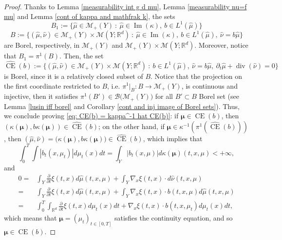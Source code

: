 \documentclass[10pt,leqno]{amsart}
\numberwithin{equation}{section}
\newcommand{\R}{\mathbb{R}}
\begin{document}
\begin{proof}
    Thanks to Lemma \ref{measurability int g d mu}, Lemma \ref{measurability nu=f mu} and Lemma \ref{cont of kappa and mathfrak k}, the sets 
    \[B_1:= \{\hat{\mu}\in \mathcal{M}_+(Y) \ : \ \hat{\mu}\in \operatorname{Im}(\kappa), \ b \in L^1(\hat{\mu})\}\]\[ B := \{(\hat{\mu},\hat{\nu})\in \mathcal{M}_+(Y)\times\mathcal{M}(Y;\R^d) \ : \ \hat{\mu}\in \operatorname{Im}(\kappa), \ b\in L^1(\hat{\mu}), \ \hat{\nu} = b\hat{\mu}\}\]
    are Borel, respectively, in $\mathcal{M}_+(Y)$ and $\mathcal{M}_+(Y)\times \mathcal{M}(Y;\R^d)$. Moreover, notice that $B_1 = \pi^1(B)$. Then, the set  
    \[\hat{\operatorname{CE}}(b):= \{(\hat{\mu},\hat{\nu})\in \mathcal{M}_+(Y)\times\mathcal{M}(Y;\R^d) \ : \ b\in L^1(\hat{\mu}), \ \hat{\nu} = b\hat{\mu},\ \partial_t\hat{\mu}+ \operatorname{div}(\hat{\nu})=0\}\]
    is Borel, since it is a relatively closed subset of $B$.
    Notice that the projection on the first coordinate restricted to $B$, i.e. $\pi^1|_{B} : B \to \mathcal{M}_+(Y)$, is continuous and injective, then it satisfies $\pi^1(B')\in \mathcal{B}\big(\mathcal{M}_+(Y)\big)$ for all $B'\subset B$ Borel set (see Lemma \ref{lusin iff borel} and Corollary \ref{cont and inj image of Borel sets}).
    Thus, we conclude proving \eqref{eq: CE(b) = kappa^-1 hat CE(b)}: if $\boldsymbol{\mu} \in \operatorname{CE}(b)$, then $(\kappa(\boldsymbol{\mu}), b \kappa(\boldsymbol{\mu})) \in \hat{\operatorname{CE}}(b)$; on the other hand, if $\boldsymbol{\mu}\in \kappa^{-1}(\pi^1(\hat{\operatorname{CE}}(b)))$, then $(\hat{\mu},\hat{\nu}) = \big(\kappa(\boldsymbol{\mu}),b \kappa(\boldsymbol{\mu})\big)\in \hat{\operatorname{CE}}(b)$, which implies that 
    \[\int_0^T \int |b_t(x,\mu_t)|d\mu_t(x) dt = \int_Y |b_t(x,\mu)|d\kappa(\boldsymbol{\mu})(t,x,\mu) <+\infty,\]
    and
    \begin{align*}
        0 = & \int_Y \frac{\partial}{\partial t}\xi(t,x) d\hat{\mu}(t,x,\mu) + \int_Y \nabla_x\xi(t,x)\cdot d\hat{\nu}(t,x,\mu)
        \\
        = & 
        \int_Y \frac{\partial}{\partial t}\xi(t,x) d\hat{\mu}(t,x,\mu) + \int_Y \nabla_x\xi(t,x)\cdot b(t,x,\mu)d\hat{\mu}(t,x,\mu)
        \\
        = & 
        \int_0^T \int_{\R^d} \frac{\partial}{\partial t} \xi(t,x) d\mu_t(x) dt + \nabla_x\xi(t,x)\cdot b(t,x,\mu_t)d\mu_t(x) dt,
    \end{align*}
    which means that $\boldsymbol{\mu} = (\mu_t)_{t\in [0,T]}$ satisfies the continuity equation, and so $\boldsymbol{\mu}\in \operatorname{CE}(b)$.
\end{proof}
\end{document}
